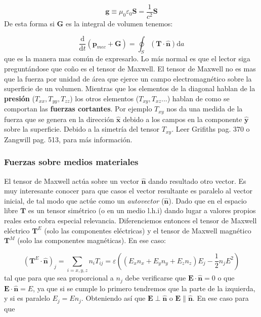 \documentclass[12pt,a4paper]{article}
\newcommand{\parentesis}[1]{\left( #1  \right)}
\newcommand{\derivadas}[2]{\frac{\D #1}{\D #2}}
\newcommand{\D}{\mathrm{d}}
\newcommand{\En}{\mathbf{E}}
\newcommand{\pn}{\mathbf{p}}
\newcommand{\Sn}{\mathbf{S}}
\newcommand{\Tn}{\mathbf{T}}
\newcommand{\Gn}{\mathbf{G}}
\newcommand{\gn}{\mathbf{g}}
\newcommand{\hnn}{\hat{\mathbf{n}}}
\newcommand{\hnx}{\hat{\mathbf{x}}}
\newcommand{\hny}{\hat{\mathbf{y}}}
\numberwithin{equation}{section}
\numberwithin{figure}{section}
\begin{document}
\begin{equation}
\gn \equiv \mu_0 \varepsilon_0 \Sn = \dfrac{1}{c^2} \Sn
\end{equation}
De esta forma si $\Gn$ es la integral de volumen tenemos:

\begin{equation}
\derivadas{}{t} \parentesis{\pn_{mec} + \Gn } = \oint_S (\Tn \cdot \hnn)\D a
\end{equation}
que es la manera mas común de expresarlo. Lo más normal es que el lector siga preguntándose que coño es el tensor de Maxwell. El tensor de Maxwell no es mas que la fuerza por unidad de área que ejerce un campo electromagnético sobre la superficie de un volumen. Mientras que los elementos de la diagonal hablan de la \textbf{presión} ($T_{xx}, T_{yy},T_{zz}$) los otros elementos ($T_ {xy},T_{xz}...$) hablan de como se comportan las \textbf{fuerzas cortantes}. Por ejemplo $T_{xy}$ nos da una medida de la fuerza que se genera en la dirección $\hnx$ debido a los campos en la componente $\hny$ sobre la superficie. Debido a la simetría del tensor $T_{xy}$. Leer Grifiths pag. 370 o Zangwill pag. 513, para más información. \\



\subsubsection{Fuerzas sobre medios materiales}

El tensor de Maxwell actúa sobre un vector $\hnn$ dando resultado otro vector. Es muy interesante conocer para que casos el vector resultante es paralelo al vector inicial, de tal modo que actúe como un \textit{autovector} ($\hnn$). Dado que en el espacio libre $\Tn$ es un tensor simétrico (o en un medio l.h.i) dando lugar a valores propios reales esto cobra especial relevancia. Diferenciemos entonces el tensor de Maxwell eléctrico $\Tn^E$ (solo las componentes eléctricas) y el tensor de Maxwell magnético  $\Tn^M$ (solo las componentes magnéticas). En ese caso:

\begin{equation} 
(\Tn^E  \cdot  \hnn )_j = \sum_{i=x,y,z} n_i T_{ij} = \varepsilon \parentesis{ \parentesis{ E_x n_x + E_y n_y + E_z n_z } E_j -  \frac{1}{2} n_j E^2}
\end{equation}
tal que para que sea proporcional a $n_j$ debe verificarse que $\En \cdot \hnn = 0$ o que $\En \cdot \hnn = E$, ya que si se cumple lo primero tendremos que la parte de la izquierda, y si es paralelo $E_j = E n_j$. Obteniendo así que $\En \perp \hnn$ o $\En \parallel \hnn$. En ese caso para que 
\end{document}
